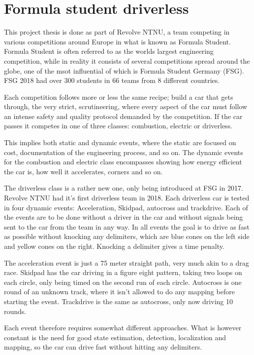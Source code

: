 \section{Formula student driverless}

This project thesis is done as part of Revolve NTNU, a team competing in various competitions around Europe in what is known as Formula Student. Formula Student is often referred to as the worlds largest engineering competition, while in reality it consists of several competitions spread around the globe, one of the msot influential of which is Formula Student Germany (FSG). FSG 2018 had over 300 students in 66 teams from 8 different countries. 

Each competition follows more or less the same recipe; build a car that gets through, the very strict, scrutineering, where every aspect of the car must follow an intense safety and quality protocol demanded by the competition. If the car passes it competes in one of three classes: combustion, electric or driverless. 

This implies both static and dynamic events, where the static are focused on cost, documentation of the engineering process, and so on. The dynamic events for the combustion and electric class encompasses showing how energy efficient the car is, how well it accelerates, corners and so on. 

The driverless class is a rather new one, only being introduced at FSG in 2017. Revolve NTNU had it's first driverless team in 2018. Each driverless car is tested in four dynamic events: Acceleration, Skidpad, autocross and trackdrive. Each of the events are to be done without a driver in the car and without signals being sent to the car from the team in any way. In all events the goal is to drive as fast as possible without knocking any delimiters, which are blue cones on the left side and yellow cones on the right. Knocking a delimiter gives a time penalty.

The acceleration event is just a 75 meter straight path, very much akin to a drag race. Skidpad has the car driving in a figure eight pattern, taking two loops on each circle, only being timed on the second run of each circle. Autocross is one round of an unknown track, where it isn't allowed to do any mapping before starting the event. Trackdrive is the same as autocross, only now driving 10 rounds. 

Each event therefore requires somewhat different approaches. What is however constant is the need for good state estimation, detection, localization and mapping, so the car can drive fast without hitting any delimiters.